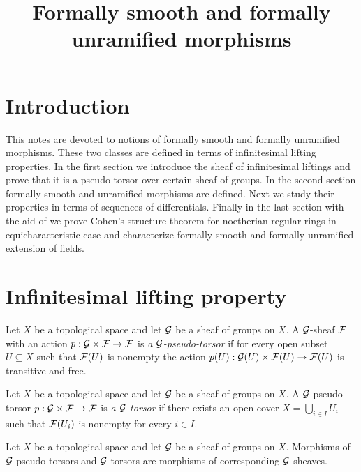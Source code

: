 



\title{Formally smooth and formally unramified morphisms}
\date{}
\maketitle

\section{Introduction}
\noindent
This notes are devoted to notions of formally smooth and formally unramified morphisms. These two classes are defined in terms of infinitesimal lifting properties. In the first section we introduce the sheaf of infinitesimal liftings and prove that it is a pseudo-torsor over certain sheaf of groups. In the second section formally smooth and unramified morphisms are defined. Next we study their properties in terms of sequences of differentials. Finally in the last section with the aid of \cite{Topics_in_fields} we prove Cohen's structure theorem for noetherian regular rings in equicharacteristic case and characterize formally smooth and formally unramified extension of fields. 

\section{Infinitesimal lifting property}

\begin{definition}
Let $X$ be a topological space and let ${\mathcal G}$ be a sheaf of groups on $X$. A ${\mathcal G}$-sheaf ${\mathcal F}$ with an action $p:{\mathcal G}\times {\mathcal F}\rightarrow {\mathcal F}$ is \textit{a ${\mathcal G}$-pseudo-torsor} if for every open subset $U\subseteq X$ such that ${\mathcal F}(U)$ is nonempty the action $p(U):{\mathcal G}(U)\times {\mathcal F}(U)\rightarrow {\mathcal F}(U)$ is transitive and free.
\end{definition}

\begin{definition}
Let $X$ be a topological space and let ${\mathcal G}$ be a sheaf of groups on $X$. A ${\mathcal G}$-pseudo-torsor $p:{\mathcal G}\times {\mathcal F}\rightarrow {\mathcal F}$ is \textit{a ${\mathcal G}$-torsor} if there exists an open cover $X=\bigcup_{i\in I}U_i$ such that ${\mathcal F}(U_i)$ is nonempty for every $i\in I$.
\end{definition}
\noindent
Let $X$ be a topological space and let ${\mathcal G}$ be a sheaf of groups on $X$. Morphisms of ${\mathcal G}$-pseudo-torsors and ${\mathcal G}$-torsors are morphisms of corresponding ${\mathcal G}$-sheaves. 

